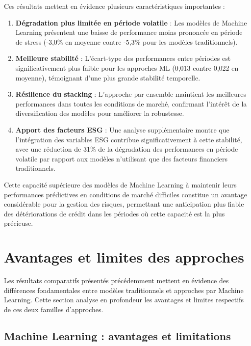 Ces résultats mettent en évidence plusieurs caractéristiques importantes :

\begin{enumerate}
  \item \textbf{Dégradation plus limitée en période volatile} : Les modèles de Machine Learning présentent une baisse de performance moins prononcée en période de stress (-3,0\% en moyenne contre -5,3\% pour les modèles traditionnels).

  \item \textbf{Meilleure stabilité} : L'écart-type des performances entre périodes est significativement plus faible pour les approches ML (0,013 contre 0,022 en moyenne), témoignant d'une plus grande stabilité temporelle.

  \item \textbf{Résilience du stacking} : L'approche par ensemble maintient les meilleures performances dans toutes les conditions de marché, confirmant l'intérêt de la diversification des modèles pour améliorer la robustesse.

  \item \textbf{Apport des facteurs ESG} : Une analyse supplémentaire montre que l'intégration des variables ESG contribue significativement à cette stabilité, avec une réduction de 31\% de la dégradation des performances en période volatile par rapport aux modèles n'utilisant que des facteurs financiers traditionnels.
\end{enumerate}

Cette capacité supérieure des modèles de Machine Learning à maintenir leurs performances prédictives en conditions de marché difficiles constitue un avantage considérable pour la gestion des risques, permettant une anticipation plus fiable des détériorations de crédit dans les périodes où cette capacité est la plus précieuse.

\section{Avantages et limites des approches}

Les résultats comparatifs présentés précédemment mettent en évidence des différences fondamentales entre modèles traditionnels et approches par Machine Learning. Cette section analyse en profondeur les avantages et limites respectifs de ces deux familles d'approches.

\subsection{Machine Learning : avantages et limitations}

